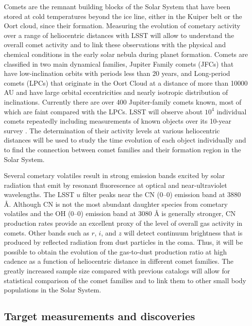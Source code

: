 Comets are the remnant building blocks of the Solar System
that have been stored at cold temperatures beyond the ice
line, either in the Kuiper belt or the Oort cloud, since their
formation.  Measuring the evolution of cometary activity over
a range of heliocentric distances with LSST will allow to
understand the overall comet activity and to link these
observations with the physical and chemical conditions in the
early solar nebula during planet formation.  Comets are
classified in two main dynamical families, Jupiter Family
comets (JFCs) that have low-inclination orbits with periods
less than 20 years, and Long-period comets (LPCs) that
originate in the Oort Cloud at a distance of more than 10000
AU and have large orbital eccentricities and nearly isotropic
distribution of inclinations.  Currently there are over 400
Jupiter-family comets known, most of which are faint compared
with the LPCs.  LSST will observe about $10^4$ individual
comets repeatedly including measurements of known objects over
its 10-year survey \citep{2010PhDT.......241S}. The
determination of their activity levels at various heliocentric
distances will be used to study the time evolution of each
object individually and to find the connection between comet
families and their formation region in the Solar System.

Several cometary volatiles result in strong emission bands
excited by solar radiation that emit by resonant fluorescence
at optical and near-ultraviolet wavelengths.  The LSST $u$
filter peaks near the CN (0--0) emission band at 3880 \r{A}.
Although CN is not the most abundant daughter species from
cometary volatiles and the OH (0--0) emission band at 3080
\r{A} is generally stronger, CN production rates provide an
excellent proxy of the level of overall gas activity in
comets. Other bands such as $r$, $i$, and $z$ will detect
continuum brightness that is produced by reflected radiation
from dust particles in the coma. Thus, it will be possible to
obtain the evolution of the gas-to-dust production ratio at
high cadence as a function of heliocentric distance in
different comet families. The greatly increased sample size
compared with previous catalogs \citep{1995Icar..118..223A}
will allow for statistical comparison of the comet families
and to link them to other small body populations in the Solar
System.


\subsection{Target measurements and discoveries}
\label{sec:\secname:targets}

